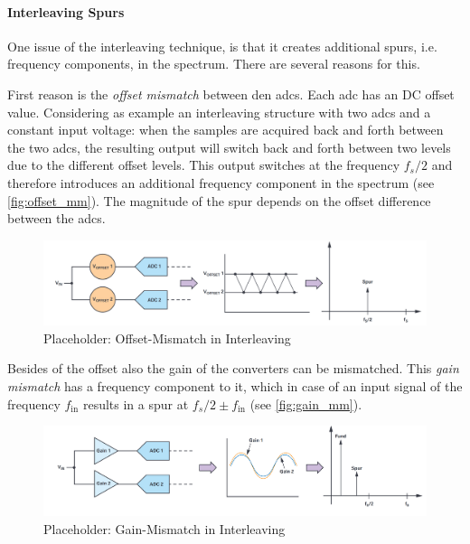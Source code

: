 \paragraph{Interleaving Spurs}
One issue of the interleaving technique, is that it creates additional spurs, i.e. frequency components, in the spectrum. There are several reasons for this.

First reason is the \textit{offset mismatch} between den \glspl{adc}. Each \gls{adc} has an DC offset value. Considering as example an interleaving structure with two \glspl{adc} and a constant input voltage: when the samples are acquired back and forth between the two \glspl{adc}, the resulting output will switch back and forth between two levels due to the different offset levels. This output switches at the frequency $f_s/2$ and therefore introduces an additional frequency component in the spectrum (see \autoref{fig:offset_mm}). The magnitude of the spur depends on the offset difference between the \glspl{adc}. \cite{Harris2019}

\begin{figure}[tbh]
	\centering
	\includegraphics[width = \textwidth]{chap/02-theory/img/offset_mm}
	\caption{Placeholder: Offset-Mismatch in Interleaving \cite{Harris2019}}
	\label{fig:offset_mm}
\end{figure}

Besides of the offset also the gain of the converters can be mismatched. This \textit{gain mismatch} has a frequency component to it, which in case of an input signal of the frequency $f_{\text{in}}$ results in a spur at $f_s/2 \pm f_{\text{in}}$ (see \autoref{fig:gain_mm}). \cite{Harris2019}
\begin{figure}[tbh]
	\centering
	\includegraphics[width = \textwidth]{chap/02-theory/img/gain_mm}
	\caption{Placeholder: Gain-Mismatch in Interleaving \cite{Harris2019}}
	\label{fig:gain_mm}
\end{figure}

